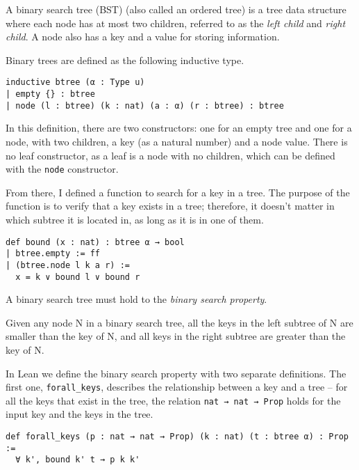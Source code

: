A binary search tree (BST) (also called an ordered tree) is a tree data structure where each node has at most two children, referred to as the \textit{left child} and \textit{right child}. A node also has a key and a value for storing information.

Binary trees are defined as the following inductive type.

\begin{lstlisting}
inductive btree (α : Type u)
| empty {} : btree
| node (l : btree) (k : nat) (a : α) (r : btree) : btree
\end{lstlisting}

In this definition, there are two constructors: one for an empty tree and one for a node, with two children, a key (as a natural number) and a node value. There is no leaf constructor, as a leaf is a node with no children, which can be defined with the \lstinline{node} constructor.

From there, I defined a function to search for a key in a tree. The purpose of the function is to verify that a key exists in a tree; therefore, it doesn't matter in which subtree it is located in, as long as it is in one of them.

\begin{lstlisting}
def bound (x : nat) : btree α → bool
| btree.empty := ff
| (btree.node l k a r) :=
  x = k ∨ bound l ∨ bound r
\end{lstlisting}

A binary search tree must hold to the \textit{binary search property}.

\begin{definition}
  \label{def:bst_property}
  Given any node N in a binary search tree, all the keys in the left subtree of N are smaller than the key of N, and all keys in the right subtree are greater than the 
  key of N.
\end{definition}

In Lean we define the binary search property with two separate definitions. The first one, \lstinline{forall_keys}, describes the relationship between a key and a tree -- for all the keys that exist in the tree, the relation \lstinline{nat → nat → Prop} holds for the input key and the keys in the tree.

\begin{lstlisting}
def forall_keys (p : nat → nat → Prop) (k : nat) (t : btree α) : Prop :=
  ∀ k', bound k' t → p k k'
\end{lstlisting}

